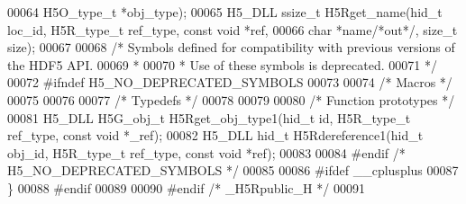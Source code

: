 \begin{DoxyCode}
00064     H5O\_type\_t *obj\_type);
00065 H5\_DLL ssize\_t H5Rget\_name(hid\_t loc\_id, H5R\_type\_t ref\_type, \textcolor{keyword}{const} \textcolor{keywordtype}{void} *ref,
00066     \textcolor{keywordtype}{char} *name\textcolor{comment}{/*out*/}, \textcolor{keywordtype}{size\_t} size);
00067 
00068 \textcolor{comment}{/* Symbols defined for compatibility with previous versions of the HDF5 API.}
00069 \textcolor{comment}{ *}
00070 \textcolor{comment}{ * Use of these symbols is deprecated.}
00071 \textcolor{comment}{ */}
00072 \textcolor{preprocessor}{#ifndef H5\_NO\_DEPRECATED\_SYMBOLS}
00073 
00074 \textcolor{comment}{/* Macros */}
00075 
00076 
00077 \textcolor{comment}{/* Typedefs */}
00078 
00079 
00080 \textcolor{comment}{/* Function prototypes */}
00081 H5\_DLL H5G\_obj\_t H5Rget\_obj\_type1(hid\_t \textcolor{keywordtype}{id}, H5R\_type\_t ref\_type, \textcolor{keyword}{const} \textcolor{keywordtype}{void} *\_ref);
00082 H5\_DLL hid\_t H5Rdereference1(hid\_t obj\_id, H5R\_type\_t ref\_type, \textcolor{keyword}{const} \textcolor{keywordtype}{void} *ref);
00083 
00084 \textcolor{preprocessor}{#endif }\textcolor{comment}{/* H5\_NO\_DEPRECATED\_SYMBOLS */}\textcolor{preprocessor}{}
00085 
00086 \textcolor{preprocessor}{#ifdef \_\_cplusplus}
00087 \}
00088 \textcolor{preprocessor}{#endif}
00089 
00090 \textcolor{preprocessor}{#endif  }\textcolor{comment}{/* \_H5Rpublic\_H */}\textcolor{preprocessor}{}
00091 
\end{DoxyCode}
